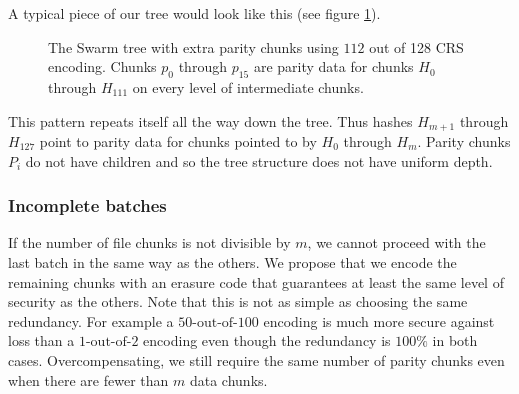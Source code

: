 
A typical piece of our tree would look like this (see figure \ref{fig:Swarm-hash-erasure}).


\begin{figure}[htbp]
   \centering
   \resizebox{1\textwidth}{!}{
        
   }
   \caption[Swarm hash erasure \statusgreen]{The Swarm tree with extra parity chunks using $112$ out of 128 CRS encoding. Chunks $p_{0}$ through $p_{15}$ are parity data for chunks $H_0 $ through $H_{111}$ on every level of intermediate chunks.}
   \label{fig:Swarm-hash-erasure}
\end{figure}


This pattern repeats itself all the way down the tree. Thus hashes $H_{m+1}$ through $H_{127}$ point to parity data for chunks pointed to by $H_0$ through $H_{m}$. Parity chunks $P_i$ do not have children and so the tree structure does not have uniform depth.

\subsubsection{Incomplete batches}

If the number of file chunks is not divisible by $m$, we cannot proceed with the last batch in the same way as the others. We propose that we encode the remaining chunks with an erasure code that guarantees at least the same level of security as the others. Note that this is not as simple as choosing the same redundancy. For example a $50\text{-out-of-}100$ encoding is much more secure against loss than a $1\text{-out-of-}2$ encoding even though the redundancy is $100\%$ in both cases. Overcompensating, we still require the same number of parity chunks even when there are fewer than $m$ data chunks.

